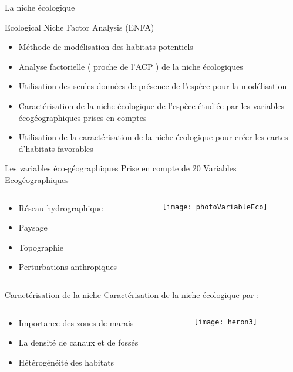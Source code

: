 \documentclass[]{beamer}
\begin{document}
\begin{frame}{La niche écologique}
  \begin{block}{Ecological Niche Factor Analysis (ENFA)}
    \begin{itemize}
    \item Méthode de modélisation des habitats potentiels
    \item Analyse factorielle ( proche de l’ACP ) de la niche écologiques
    \item Utilisation des seules données de présence de l’espèce pour la modélisation
    \item Caractérisation de la niche écologique de l’espèce étudiée par les variables écogéographiques prises en comptes
    \item Utilisation de la caractérisation de la niche écologique pour créer les cartes d’habitats favorables 
    \end{itemize}
  \end{block}
\end{frame}



\begin{frame}{Les variables éco-géographiques}
  Prise en compte de 20 Variables Ecogéographiques
  \vspace{20pt}
  \begin{columns}
    \begin{column}[c]{0.4\textwidth}
      \begin{itemize}[<+->]
      \item  Réseau hydrographique
      \item Paysage
      \item Topographie
      \item Perturbations anthropiques
      \end{itemize}
    \end{column}
    \begin{column}[c]{0.6\textwidth}
      \texttt{[image: photoVariableEco]} 
    \end{column}
  \end{columns}
\end{frame}


\begin{frame}{Caractérisation de la niche}
  Caractérisation de la niche écologique par :
  \vspace{20pt}
  \begin{columns}
    \begin{column}[c]{0.5\textwidth}
      \begin{itemize}[<+->]
      \item  Importance des zones de marais
      \item La densité de canaux et de fossés
      \item Hétérogénéité des habitats
      \end{itemize}
    \end{column}
    \begin{column}[c]{0.5\textwidth}
      \texttt{[image: heron3]} 
    \end{column}
  \end{columns}
\end{frame}
\end{document}
